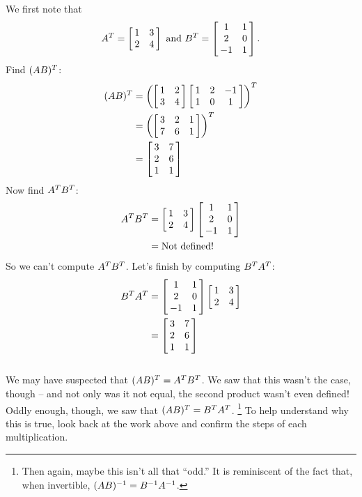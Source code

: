 {We first note that $$\ttat = \bmx{cc}1&3\\2&4\emx \ \text{and} \ \ttbt = \bmx{cc}1&1\\2&0\\-1&1\emx.$$
Find $(\tta\ttb)^T$:
\begin{align*}
	(\tta\ttb)^T &= \left(\bmx{cc}1&2\\3&4\emx \bmx{ccc}1&2&-1\\1&0&1\emx\right)^T \\
							&= \left(\bmx{ccc}3&2&1\\7&6&1\emx\right)^T\\
							&= \bmx{cc}3&7\\2&6\\1&1\emx
\end{align*}
Now find $\ttat\ttbt$:
\begin{align*}
			\ttat\ttbt	&=	\bmx{cc}1&3\\2&4\emx\bmx{cc}1&1\\2&0\\-1&1\emx \\
									&= 	\text{Not defined!}
\end{align*}
So we can't compute $\ttat\ttbt$. Let's finish by computing $\ttbt\ttat$:
\begin{align*}
			\ttbt\ttat 	&=	\bmx{cc}1&1\\2&0\\-1&1\emx\bmx{cc}1&3\\2&4\emx\\
									&=\bmx{cc}3&7\\2&6\\1&1\emx
\end{align*}
\ } \\ %

We may have suspected that $(\tta\ttb)^T = \ttat\ttbt$. We saw that this wasn't the case, though -- and not only was it not equal, the second product wasn't even defined! Oddly enough, though, we saw that $(\tta\ttb)^T = \ttbt\ttat$.
\footnote{Then again, maybe this isn't all that ``odd.'' It is reminiscent of the fact that, when invertible, $(\tta\ttb)^{-1} = \ttbi\ttai$.} 
To help understand why this is true, look back at the work above and confirm the steps of each multiplication.

